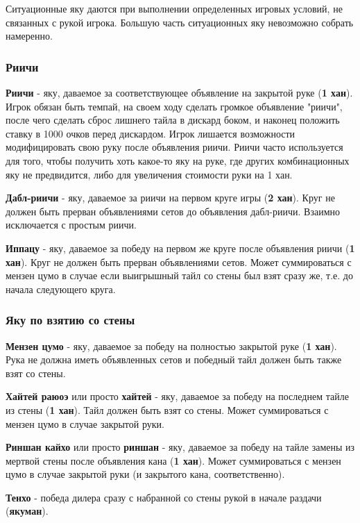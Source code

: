 Ситуационные яку даются при выполнении определенных игровых условий, не связанных с рукой игрока. Большую часть ситуационных яку невозможно собрать намеренно.

\subsubsection{Риичи}

\textbf{Риичи} - яку, даваемое за соответствующее объявление на закрытой руке (\textbf{1 хан}). Игрок обязан быть темпай, на своем ходу сделать громкое объявление "риичи", после чего сделать сброс лишнего тайла в дискард боком, и наконец положить ставку в 1000 очков перед дискардом. Игрок лишается возможности модифицировать свою руку после объявления риичи. Риичи часто используется для того, чтобы получить хоть какое-то яку на руке, где других комбинационных яку не предвидится, либо для увеличения стоимости руки на 1 хан.

\textbf{Дабл-риичи} - яку, даваемое за риичи на первом круге игры (\textbf{2 хан}). Круг не должен быть прерван объявлениями сетов до объявления дабл-риичи. Взаимно исключается с простым риичи.

\textbf{Иппацу} - яку, даваемое за победу на первом же круге после объявления риичи (\textbf{1 хан}). Круг не должен быть прерван объявлениями сетов. Может суммироваться с мензен цумо в случае если выигрышный тайл со стены был взят сразу же, т.е. до начала следующего круга.

\subsubsection{Яку по взятию со стены}

\textbf{Мензен цумо} - яку, даваемое за победу на полностью закрытой руке (\textbf{1 хан}). Рука не должна иметь объявленных сетов и победный тайл должен быть также взят со стены.

\textbf{Хайтей раюоэ} или просто \textbf{хайтей} - яку, даваемое за победу на последнем тайле из стены (\textbf{1 хан}). Тайл должен быть взят со стены. Может суммироваться с мензен цумо в случае закрытой руки.

\textbf{Риншан кайхо} или просто \textbf{риншан} - яку, даваемое за победу на тайле замены из мертвой стены после объявления кана (\textbf{1 хан}). Может суммироваться с мензен цумо в случае закрытой руки (и закрытого кана, соответственно).

\textbf{Тенхо} - победа дилера сразу с набранной со стены рукой в начале раздачи (\textbf{якуман}).

